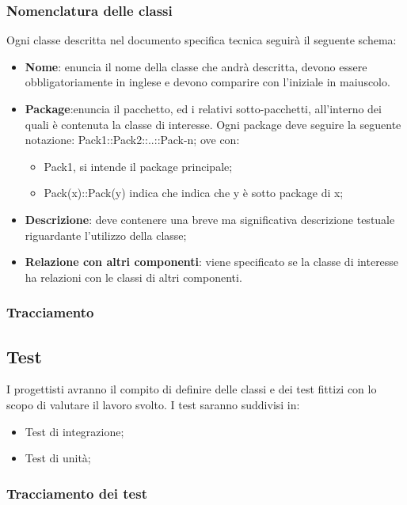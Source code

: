 \subsubsection{Nomenclatura delle classi}
Ogni classe descritta nel documento specifica tecnica seguirà il seguente schema:
\begin{itemize}
\item \textbf{Nome}: enuncia il nome della classe che andrà descritta, devono essere obbligatoriamente in inglese e devono comparire con l'iniziale in maiuscolo.
\item \textbf{Package}:enuncia il pacchetto, ed i relativi sotto-pacchetti, all'interno dei quali è contenuta la classe di interesse.
Ogni package deve seguire la seguente notazione: Pack1::Pack2::..::Pack-n;
ove con:
\begin{itemize}
\item Pack1, si intende il package principale;
\item Pack(x)::Pack(y) indica che indica che y è sotto package di x;
\end{itemize}

\item \textbf{Descrizione}: deve contenere una breve ma significativa descrizione testuale riguardante l'utilizzo della classe;
\item \textbf{Relazione con altri componenti}: viene specificato se la classe di interesse ha relazioni con le classi di altri componenti.
\end{itemize}

\subsubsection{Tracciamento}

\subsection{Test} I progettisti avranno il compito di definire delle classi e dei test fittizi con lo scopo di valutare il lavoro svolto.
I test saranno suddivisi in:
\begin{itemize}
\item Test di integrazione;
\item Test di unità;
\end{itemize}

\subsubsection{Tracciamento dei test}

